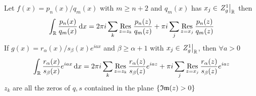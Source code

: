 \documentclass[../complete.tex]{subfiles}
\begin{document}
\begin{thm}
	Let $f(x)=p_n(x)/q_m(x)$ with $m\ge n+2$ and $q_m(x)$ has $x_j\in \left.Z_g^1\right|_{\mathbb{R}}$ then
	\begin{equation}
		\int_{\mathbb{R}}^{}\frac{p_n(x)}{q_m(x)}\operatorname{d\!} x=2\pi i\sum_k\operatorname*{\mathrm{Res}}_{z=z_k}\frac{p_n(z)}{q_m(z)}+\pi i\sum_j\operatorname*{\mathrm{Res}}_{z=x_j}\frac{p_n(z)}{q_m(z)}
		\label{eq:ratintsimple}
	\end{equation}
	If $g(x)=r_\alpha(x)/s_\beta(x)e^{iax}$ and $\beta\ge\alpha+1$ with $x_j\in\left.Z_g^1\right|_{\mathbb{R}}$, then $\forall a>0$
	\begin{equation}
		\int_{\mathbb{R}}^{}\frac{r_\alpha(x)}{s_\beta(x)}e^{iax}\operatorname{d\!} x=2\pi i\sum_k\operatorname*{\mathrm{Res}}_{z=z_k}\frac{r_\alpha(z)}{s_\beta(z)}e^{iaz}+\pi i\sum_j\operatorname*{\mathrm{Res}}_{z=x_j}\frac{r_\alpha(z)}{s_\beta(z)}e^{iaz}
		\label{eq:fourierratintsimp}
	\end{equation}
	$z_k$ are all the zeros of $q,s$ contained in the plane $\{\mathfrak{Im}(z)>0\}$
\end{thm}
\end{document}
